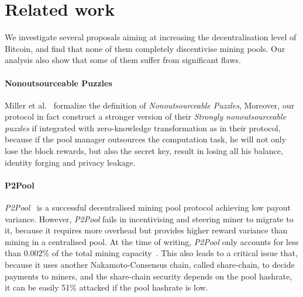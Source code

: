 \section{Related work}

We investigate several proposals aiming at increasing the decentralisation level of Bitcoin, and find that none of them completely discentivise mining pools.
Our analysis also show that some of them suffer from significant flaws.

\paragraph{\textbf{Nonoutsourceable Puzzles}}
Miller et al.~\cite{miller2015nonoutsourceable} formalize the definition of \textit{Nonoutsourceable Puzzles},
Moreover, our protocol in fact construct a stronger version of their \textit{Strongly nonoutsourceable puzzles} if integrated with zero-knowledge transformation as in their protocol, because if the pool manager outsources the computation task, he will not only lose the block rewards, but also the secret key, result in losing all his balance, identity forging and privacy leakage.


\paragraph{\textbf{P2Pool}}
\textit{P2Pool}~\cite{p2pool} is a successful decentralised mining pool protocol achieving low payout variance.
However, \textit{P2Pool} fails in incentivising and steering miner to migrate to it, because it requires more overhead but provides higher reward variance than mining in a centralised pool.
At the time of writing, \textit{P2Pool} only accounts for less than 0.002\% of the total mining capacity~\cite{p2pool-stats}.
This also leads to a critical issue that, because it uses another Nakamoto-Consensus chain, called share-chain, to decide payments to miners, and the share-chain security depends on the pool hashrate, it can be easily 51\% attacked if the pool hashrate is low.


